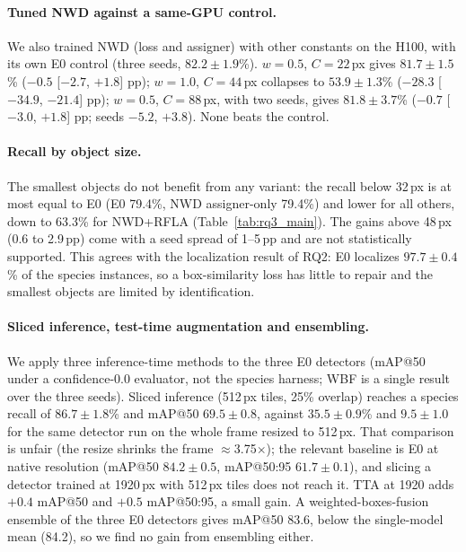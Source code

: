 \paragraph{Tuned NWD against a same-GPU control.}
We also trained NWD (loss and assigner) with other constants on the H100, with its own E0 control (three seeds, $82.2\pm1.9$\%). $w{=}0.5$, $C{=}22$\,px gives $81.7\pm1.5$\% ($-0.5$ [$-2.7$, $+1.8$] pp); $w{=}1.0$, $C{=}44$\,px collapses to $53.9\pm1.3$\% ($-28.3$ [$-34.9$, $-21.4$] pp); $w{=}0.5$, $C{=}88$\,px, with two seeds, gives $81.8\pm3.7$\% ($-0.7$ [$-3.0$, $+1.8$] pp; seeds $-5.2$, $+3.8$). None beats the control.

\paragraph{Recall by object size.}
The smallest objects do not benefit from any variant: the recall below 32\,px is at most equal to E0 (E0 79.4\%, NWD assigner-only 79.4\%) and lower for all others, down to 63.3\% for NWD+RFLA (Table~\ref{tab:rq3_main}). The gains above 48\,px (0.6 to 2.9\,pp) come with a seed spread of 1--5\,pp and are not statistically supported. This agrees with the localization result of RQ2: E0 localizes $97.7\pm0.4$\% of the species instances, so a box-similarity loss has little to repair and the smallest objects are limited by identification.

\paragraph{Sliced inference, test-time augmentation and ensembling.}
We apply three inference-time methods to the three E0 detectors (mAP@50 under a confidence-0.0 evaluator, not the species harness; WBF is a single result over the three seeds). Sliced inference (512\,px tiles, 25\% overlap) reaches a species recall of $86.7\pm1.8$\% and mAP@50 $69.5\pm0.8$, against $35.5\pm0.9$\% and $9.5\pm1.0$ for the same detector run on the whole frame resized to 512\,px. That comparison is unfair (the resize shrinks the frame $\approx$3.75$\times$); the relevant baseline is E0 at native resolution (mAP@50 $84.2\pm0.5$, mAP@50:95 $61.7\pm0.1$), and slicing a detector trained at 1920\,px with 512\,px tiles does not reach it. TTA at 1920 adds $+0.4$ mAP@50 and $+0.5$ mAP@50:95, a small gain. A weighted-boxes-fusion ensemble of the three E0 detectors gives mAP@50 $83.6$, below the single-model mean (84.2), so we find no gain from ensembling either.


